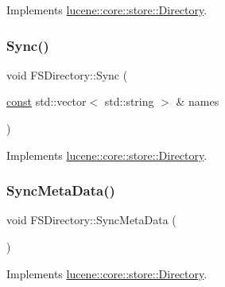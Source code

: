 Implements \mbox{\hyperlink{classlucene_1_1core_1_1store_1_1Directory_a41371672f0e4f3d05432013778fedfb0}{lucene\+::core\+::store\+::\+Directory}}.

\mbox{\label{classlucene_1_1core_1_1store_1_1FSDirectory_a142dc145b0d1a4003c6a940a1da0f1e5}} 
\subsubsection{\texorpdfstring{Sync()}{Sync()}}
{\footnotesize\ttfamily void F\+S\+Directory\+::\+Sync (\begin{DoxyParamCaption}\item[{\mbox{\hyperlink{ZlibCrc32_8h_a2c212835823e3c54a8ab6d95c652660e}{const}} std\+::vector$<$ std\+::string $>$ \&}]{names }\end{DoxyParamCaption})\hspace{0.3cm}{\ttfamily [virtual]}}



Implements \mbox{\hyperlink{classlucene_1_1core_1_1store_1_1Directory_a9bf7aa728353d62ada6d7d0b431b12a0}{lucene\+::core\+::store\+::\+Directory}}.

\mbox{\label{classlucene_1_1core_1_1store_1_1FSDirectory_a3427605a8d3b36c51f623896f73e525c}} 
\subsubsection{\texorpdfstring{Sync\+Meta\+Data()}{SyncMetaData()}}
{\footnotesize\ttfamily void F\+S\+Directory\+::\+Sync\+Meta\+Data (\begin{DoxyParamCaption}{ }\end{DoxyParamCaption})\hspace{0.3cm}{\ttfamily [virtual]}}



Implements \mbox{\hyperlink{classlucene_1_1core_1_1store_1_1Directory_aa5ad7f9b517071b37c7d10858480f26d}{lucene\+::core\+::store\+::\+Directory}}.




